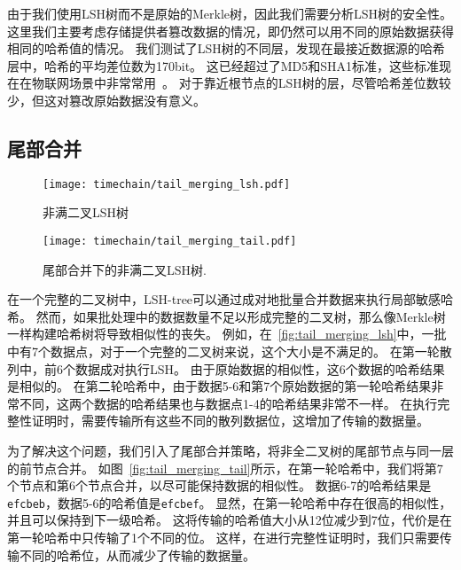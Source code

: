 由于我们使用LSH树而不是原始的Merkle树，因此我们需要分析LSH树的安全性。
这里我们主要考虑存储提供者篡改数据的情况，即仍然可以用不同的原始数据获得相同的哈希值的情况。
我们测试了LSH树的不同层，发现在最接近数据源的哈希层中，哈希的平均差位数为170bit。
这已经超过了MD5和SHA1标准，这些标准现在在物联网场景中非常常用~\cite{chi2017hashing,landge2018secured}。
对于靠近根节点的LSH树的层，尽管哈希差位数较少，但这对篡改原始数据没有意义。

\subsection{尾部合并}

\begin{figure}[t]
    \centering
	\begin{minipage}{0.8\linewidth}
        \centering
        \texttt{[image: timechain/tail\_merging\_lsh.pdf]}
        \caption{非满二叉LSH树}
        \label{fig:tail_merging_lsh}
	\end{minipage}
\end{figure}

\begin{figure}[t]
    \centering
	\begin{minipage}{0.8\linewidth}
        \centering
        \texttt{[image: timechain/tail\_merging\_tail.pdf]}
	\end{minipage}
	\caption{尾部合并下的非满二叉LSH树.}
	\label{fig:tail_merging_tail}
\end{figure}

在一个完整的二叉树中，LSH-tree可以通过成对地批量合并数据来执行局部敏感哈希。
然而，如果批处理中的数据数量不足以形成完整的二叉树，那么像Merkle树一样构建哈希树将导致相似性的丧失。
例如，在~\autoref{fig:tail_merging_lsh}中，一批中有7个数据点，对于一个完整的二叉树来说，这个大小是不满足的。
在第一轮散列中，前6个数据成对执行LSH。
由于原始数据的相似性，这6个数据的哈希结果是相似的。
在第二轮哈希中，由于数据5-6和第7个原始数据的第一轮哈希结果非常不同，这两个数据的哈希结果也与数据点1-4的哈希结果非常不一样。
在执行完整性证明时，需要传输所有这些不同的散列数据位，这增加了传输的数据量。

为了解决这个问题，我们引入了尾部合并策略，将非全二叉树的尾部节点与同一层的前节点合并。
如图~\autoref{fig:tail_merging_tail}所示，在第一轮哈希中，我们将第7个节点和第6个节点合并，以尽可能保持数据的相似性。
数据6-7的哈希结果是\texttt{efcbeb}，数据5-6的哈希值是\texttt{efcbef}。
显然，在第一轮哈希中存在很高的相似性，并且可以保持到下一级哈希。
这将传输的哈希值大小从12位减少到7位，代价是在第一轮哈希中只传输了1个不同的位。
这样，在进行完整性证明时，我们只需要传输不同的哈希位，从而减少了传输的数据量。

